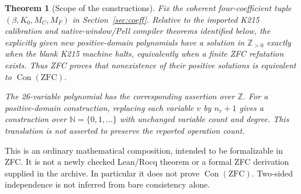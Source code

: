 \documentclass[11pt]{article}
\newcommand{\Z}{\mathbb Z}
\newcommand{\N}{\mathbb N}
\newcommand{\Pos}{\mathbb Z_{>0}}
\newcommand{\Con}{\operatorname{Con}}
\newtheorem{theorem}{Theorem}
\begin{document}
\begin{theorem}[Scope of the constructions]\label{thm:main}
Fix the coherent four-coefficient tuple $(\beta,K_0,M_C,M_F)$ in Section~\ref{sec:coeff}. Relative to the imported K215 calibration and native-window/Pell compiler theorems identified below, the explicitly given new positive-domain polynomials have a solution in $\Pos$ exactly when the blank K215 machine halts, equivalently when a finite ZFC refutation exists. Thus ZFC proves that nonexistence of their positive solutions is equivalent to $\Con(\mathrm{ZFC})$.

The 26-variable polynomial has the corresponding assertion over $\Z$. For a positive-domain construction, replacing each variable $v$ by $n_v+1$ gives a construction over $\N=\{0,1,\ldots\}$ with unchanged variable count and degree. This translation is not asserted to preserve the reported operation count.
\end{theorem}

This is an ordinary mathematical composition, intended to be formalizable in ZFC. It is not a newly checked Lean/Rocq theorem or a formal ZFC derivation supplied in the archive. In particular it does not prove $\Con(\mathrm{ZFC})$. Two-sided independence is not inferred from bare consistency alone.
\end{document}
